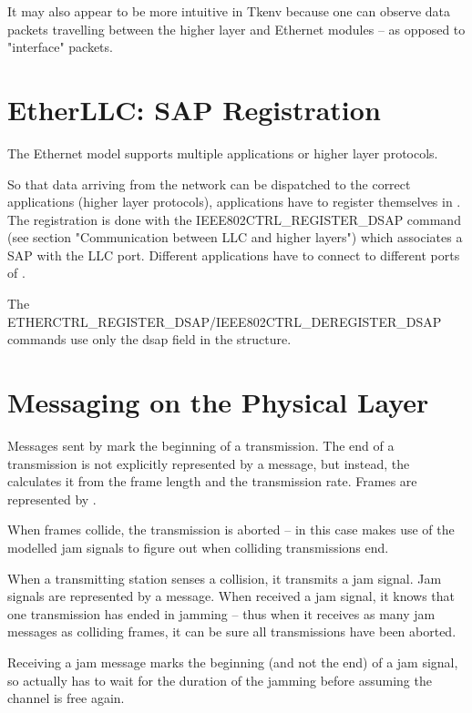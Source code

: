 It may also appear to be more intuitive in Tkenv because one can observe
data packets travelling between the higher layer and Ethernet
modules -- as opposed to "interface" packets.


\section{EtherLLC: SAP Registration}

The Ethernet model supports multiple applications or higher layer
protocols.

So that data arriving from the network can be dispatched to the
correct applications (higher layer protocols), applications
have to register themselves in . The registration
is done with the IEEE802CTRL\_REGISTER\_DSAP command
(see section "Communication between LLC and higher layers")
which associates a SAP with the LLC port. Different applications
have to connect to different ports of .

The ETHERCTRL\_REGISTER\_DSAP/IEEE802CTRL\_DEREGISTER\_DSAP commands use only the
dsap field in the  structure.


\section{Messaging on the Physical Layer}

Messages sent by  mark the beginning of a transmission.
The end of a transmission is not explicitly represented by a message,
but instead, the  calculates it from the frame length and
the transmission rate. Frames are represented by .

When frames collide, the transmission is aborted -- in this case
 makes use of the modelled jam signals to figure out
when colliding transmissions end.

When a transmitting station senses a collision, it transmits a jam signal.
Jam signals are represented by a  message.
When  received a jam signal, it knows that one transmission
has ended in jamming -- thus when it receives as many jam messages
as colliding frames, it can be sure all transmissions have been aborted.

Receiving a jam message marks the beginning (and not the end)
of a jam signal, so actually  has to wait for the duration
of the jamming before assuming the channel is free again.



